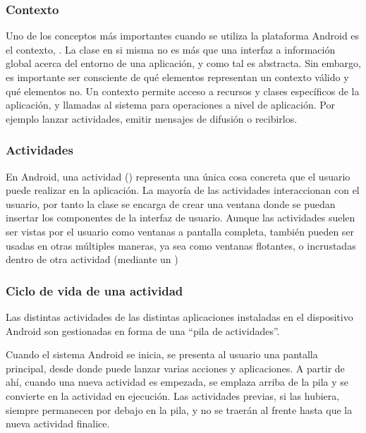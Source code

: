 \subsubsection{Contexto}
    Uno de los conceptos más importantes cuando se utiliza la plataforma Android es el contexto, . La clase  en si misma no es más que una interfaz a información global acerca del entorno de una aplicación, y como tal es abstracta. Sin embargo, es importante ser consciente de qué elementos representan un contexto válido y qué elementos no. Un contexto permite acceso a recursos y clases específicos de la aplicación, y llamadas al sistema para operaciones a nivel de aplicación. Por ejemplo lanzar actividades, emitir mensajes de difusión o recibirlos.

\subsubsection{Actividades}
    En Android, una actividad () representa una única cosa concreta que el usuario puede realizar en la aplicación. La mayoría de las actividades interaccionan con el usuario, por tanto la clase  se encarga de crear una ventana donde se puedan insertar los componentes de la interfaz de usuario. Aunque las actividades suelen ser vistas por el usuario como ventanas a pantalla completa, también pueden ser usadas en otras múltiples maneras, ya sea como ventanas flotantes, o incrustadas dentro de otra actividad (mediante un )

\subsubsection{Ciclo de vida de una actividad}
    Las distintas actividades de las distintas aplicaciones instaladas en el dispositivo Android son gestionadas en forma de una ``pila de actividades''.
 
    Cuando el sistema Android se inicia, se presenta al usuario una pantalla principal, desde donde puede lanzar varias acciones y aplicaciones. A partir de ahí, cuando una nueva actividad es empezada, se emplaza arriba de la pila y se convierte en la actividad en ejecución. Las actividades previas, si las hubiera, siempre permanecen por debajo en la pila, y no se traerán al frente hasta que la nueva actividad finalice.

